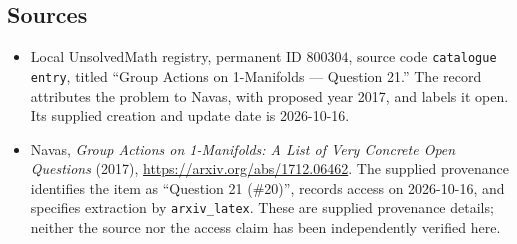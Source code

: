 \documentclass[11pt]{article}
\begin{document}
\subsection{Sources}
\begin{itemize}
\item Local UnsolvedMath registry, permanent ID \(800304\), source code \texttt{catalogue entry}, titled ``Group Actions on 1-Manifolds --- Question 21.'' The record attributes the problem to Navas, with proposed year 2017, and labels it open. Its supplied creation and update date is 2026-10-16.
\item Navas, \emph{Group Actions on 1-Manifolds: A List of Very Concrete Open Questions} (2017), \url{https://arxiv.org/abs/1712.06462}. The supplied provenance identifies the item as ``Question 21 (\#20)'', records access on 2026-10-16, and specifies extraction by \texttt{arxiv\_latex}. These are supplied provenance details; neither the source nor the access claim has been independently verified here.
\end{itemize}
\end{document}
